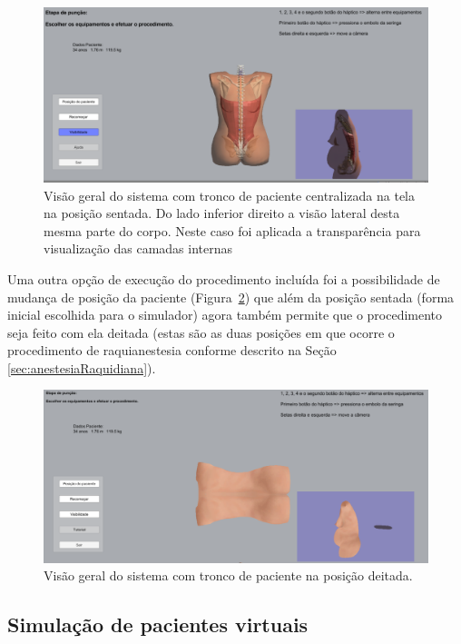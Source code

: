 \begin{figure}[ht!]
    \centering
    \includegraphics[width=0.9\linewidth]{capitulos/figuras/sistema posicao sentada com transparencia.png} 
    \caption{Visão geral do sistema com tronco de paciente centralizada na tela na posição sentada. Do lado inferior direito a visão lateral desta mesma parte do corpo. Neste caso foi aplicada a transparência para visualização das camadas internas}
    \label{fig:posicaoSentadaComTransparencia}
\end{figure}

Uma outra opção de execução do procedimento incluída foi a possibilidade de mudança de posição da paciente (Figura~\ref{fig:posicaoDeitada}) que além da posição sentada (forma inicial escolhida para o simulador) agora também permite que o procedimento seja feito com ela deitada (estas são as duas posições em que ocorre o procedimento de raquianestesia conforme descrito na Seção \ref{sec:anestesiaRaquidiana}).

\begin{figure}[ht!]
    \centering
    \includegraphics[width=0.9\linewidth]{capitulos/figuras/sistema posicao deitada.png} 
    \caption{Visão geral do sistema com tronco de paciente na posição deitada.}
    \label{fig:posicaoDeitada}
\end{figure}

\subsection {Simulação de pacientes virtuais} 
\label{sec:SimulacaoPacientesVirtuais}

